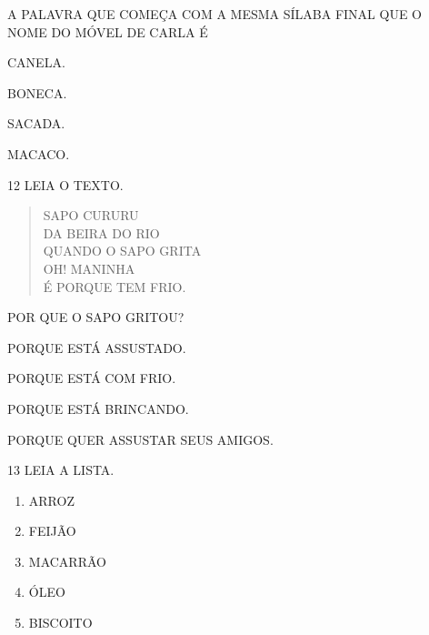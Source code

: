 A PALAVRA QUE COMEÇA COM A MESMA SÍLABA FINAL QUE O NOME DO MÓVEL DE CARLA É 

\begin{multicols}{2}
\begin{escolha}[itemsep=0pt]
\item CANELA.

\item BONECA.

\item SACADA.

\item MACACO.
\end{escolha}
\end{multicols}

\num{12} LEIA O TEXTO.

\begin{myquote}
\begin{verse}
SAPO CURURU\\
DA BEIRA DO RIO\\
QUANDO O SAPO GRITA\\
OH! MANINHA\\
É PORQUE TEM FRIO.
\end{verse}

\end{myquote}

POR QUE O SAPO GRITOU?

\begin{escolha}[itemsep=0pt]
\item PORQUE ESTÁ ASSUSTADO. 

\item PORQUE ESTÁ COM FRIO.

\item PORQUE ESTÁ BRINCANDO.

\item PORQUE QUER ASSUSTAR SEUS AMIGOS.
\end{escolha}

\pagebreak

\num{13} LEIA A LISTA.

\begin{myquote}
\begin{enumerate}
\item ARROZ

\item FEIJÃO

\item MACARRÃO

\item ÓLEO

\item BISCOITO



\end{enumerate}
\end{myquote}

